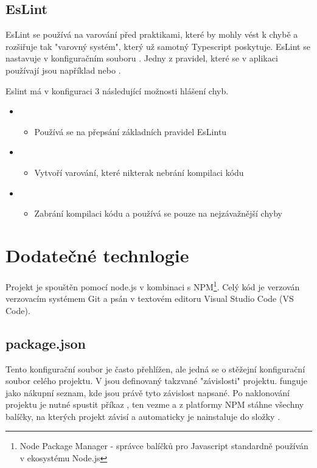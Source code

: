 \subsection{EsLint}
EsLint se používá na varování před praktikami, které by mohly vést k chybě a rozšiřuje tak "varovný systém", který už samotný Typescript poskytuje.
EsLint se nastavuje v konfiguračním souboru . Jedny z pravidel, které se v aplikaci používají jsou například  nebo .

Eslint má v konfiguraci 3 následující možnosti hlášení chyb\cite{eslint}.
\begin{itemize}
    \item {}
    \begin{itemize}
         \item Používá se na přepsání základních pravidel EsLintu
    \end{itemize}
    \item {}
    \begin{itemize}
        \item Vytvoří varování, které nikterak nebrání kompilaci kódu
    \end{itemize}
    \item {}
    \begin{itemize}
        \item Zabrání kompilaci kódu a používá se pouze na nejzávažnější chyby
    \end{itemize}
\end{itemize}


\section{Dodatečné technlogie}
Projekt je spouštěn pomocí node.js v kombinaci s NPM\footnote{Node Package Manager - správce balíčků pro Javascript standardně používán v ekosystému Node.js}. Celý kód je verzován verzovacím systémem Git a psán v textovém editoru Visual Studio Code (VS Code).
\subsection{package.json}
Tento konfigurační soubor je často přehlížen, ale jedná se o stěžejní konfigurační soubor celého projektu. V  jsou definovaný takzvané "závislosti" projektu.  funguje jako nákupní seznam, kde jsou právě tyto závislost napsané. Po naklonování projektu je nutné spustit příkaz , ten vezme  a z platformy NPM\cite{npm} stáhne všechny balíčky, na kterých projekt závisí a automaticky je nainstaluje do složky .

